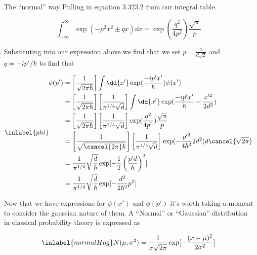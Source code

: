 \begin{answer}
\begin{answerpart}{The ``normal'' way}
    Pulling in equation 3.323.2 from our integral table.
    \cite[eq3.323.2]{gr}

    \begin{equation}
      \tag{3.323.2}
      \int_{-\infty}^{\infty} \exp\left(-p^2x^2 \pm qx\right) \dd{x}
      = \exp\left(\frac{q^2}{4p^2}\right)\frac{\sqrt{\pi}}{p}
    \end{equation}

    Substituting into our expression above we find that we set $p =
    \frac{1}{d\sqrt{2}}$ and $q = -ip'/\hbar$ to find that


    \begin{equation}
      \inlabel{phi}
      \begin{split}
        \phi(p')
        &= 
        \left[ \frac{1}{\sqrt{2\pi\hbar}} \right]
        \int \dd{x'} \exp(\frac{-ip'x'}{\hbar})\psi(x')
        \\
        &= 
        \left[ \frac{1}{\sqrt{2\pi\hbar}} \right]
        \left[\frac{1}{\pi^{1/4}\sqrt{d}}\right]
        \int \dd{x'}
        \exp(\frac{-ip'x'}{\hbar}
        - \frac{x'^{2}}{2d^2})
        \\
        &= 
        \left[ \frac{1}{\sqrt{2\pi\hbar}} \right]
        \left[\frac{1}{\pi^{1/4}\sqrt{d}}\right]
        \exp(\frac{q^2}{4p^2})
        \frac{\sqrt{\pi}}{p}
        \\
        &= 
        \left[ \frac{1}{\sqrt{\cancel{2\pi}\hbar}} \right]
        \left[\frac{1}{\pi^{1/4}\sqrt{d}}\right]
        \exp(-\frac{p'^2}{4\hbar^2}2d^2)
        d\cancel{\sqrt{2\pi}}
        \\
        &= 
        \frac{1}{\pi^{1/4}}
        \sqrt{\frac{d}{\hbar}}
        \exp[-\frac{1}{2}\left(\frac{p'd}{\hbar}\right)^2]
        \\
        &= 
        \frac{1}{\pi^{1/4}}
        \sqrt{\frac{d}{\hbar}}
        \exp[-\frac{d^2}{2\hbar^2}p^2]
        \\
      \end{split}
    \end{equation}

    Now that we have expressions for $\psi(x')$ and $\phi(p')$ it's
    worth taking a moment to consider the gaussian nature of them.  A
    ``Normal'' or ``Gaussian'' distribution in classical probability
    theory is expressed as

    \begin{equation}
      \inlabel{normalHog}
      N(\mu, \sigma^2)
      = \frac{1}{\sigma\sqrt{2\pi}}\exp[-\frac{(x-\mu)^2}{2\sigma^2}]
    \end{equation}


\end{answerpart}
\end{answer}
